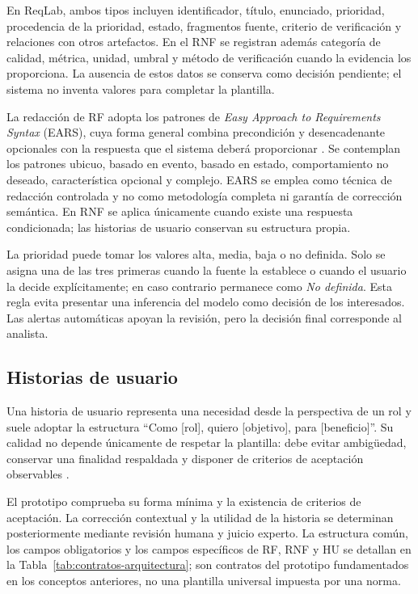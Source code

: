 En ReqLab, ambos tipos incluyen identificador, título, enunciado, prioridad, procedencia de la prioridad, estado, fragmentos fuente, criterio de verificación y relaciones con otros artefactos. En el RNF se registran además categoría de calidad, métrica, unidad, umbral y método de verificación cuando la evidencia los proporciona. La ausencia de estos datos se conserva como decisión pendiente; el sistema no inventa valores para completar la plantilla.

La redacción de RF adopta los patrones de \emph{Easy Approach to Requirements Syntax} (EARS), cuya forma general combina precondición y desencadenante opcionales con la respuesta que el sistema deberá proporcionar \cite{mavin2009}. Se contemplan los patrones ubicuo, basado en evento, basado en estado, comportamiento no deseado, característica opcional y complejo. EARS se emplea como técnica de redacción controlada y no como metodología completa ni garantía de corrección semántica. En RNF se aplica únicamente cuando existe una respuesta condicionada; las historias de usuario conservan su estructura propia.

La prioridad puede tomar los valores alta, media, baja o no definida. Solo se asigna una de las tres primeras cuando la fuente la establece o cuando el usuario la decide explícitamente; en caso contrario permanece como \emph{No definida}. Esta regla evita presentar una inferencia del modelo como decisión de los interesados. Las alertas automáticas apoyan la revisión, pero la decisión final corresponde al analista.

\subsection{Historias de usuario}

Una historia de usuario representa una necesidad desde la perspectiva de un rol y suele adoptar la estructura ``Como [rol], quiero [objetivo], para [beneficio]''. Su calidad no depende únicamente de respetar la plantilla: debe evitar ambigüedad, conservar una finalidad respaldada y disponer de criterios de aceptación observables \cite{lucassen2016}.

El prototipo comprueba su forma mínima y la existencia de criterios de aceptación. La corrección contextual y la utilidad de la historia se determinan posteriormente mediante revisión humana y juicio experto. La estructura común, los campos obligatorios y los campos específicos de RF, RNF y HU se detallan en la Tabla~\ref{tab:contratos-arquitectura}; son contratos del prototipo fundamentados en los conceptos anteriores, no una plantilla universal impuesta por una norma.

